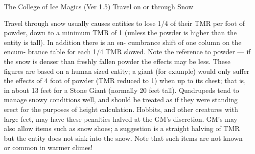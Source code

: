 \begin{Chapter}{The College of Ice Magics (Ver 1.5)}
Travel on or through Snow 

Travel through snow usually causes entities to lose 
1/4  of  their  TMR  per  foot  of  powder,  down  to  a 
minimum  TMR  of  1  (unless  the  powder  is  higher 
than  the  entity  is  tall).  In  addition  there  is  an  en-
cumbrance  shift  of  one  column  on  the  encum-
brance  table  for  each  1/4  TMR  slowed.  Note  the 
reference  to  powder  —  if  the  snow  is  denser  than 
freshly  fallen  powder  the  effects  may  be  less. 
These figures are based on a human sized entity; a 
giant (for example) would only suffer the effects of 
4  foot  of  powder  (TMR  reduced  to  1)  when  up  to 
its chest; that is, in about 13 feet for a Stone Giant 
(normally 20 feet tall). Quadrupeds tend to manage 
snowy  conditions  well,  and  should be  treated  as  if 
they were standing erect for the purposes of height 
calculation. Hobbits, and other creatures with large 
feet,  may  have  these  penalties  halved  at  the  GM’s 
discretion.  GM’s  may  also  allow  items  such  as 
snow  shoes;  a  suggestion  is  a  straight  halving  of 
TMR  but  the  entity  does  not  sink  into  the  snow. 
Note that such items are not known or common in 
warmer climes! 

\end{Chapter}
